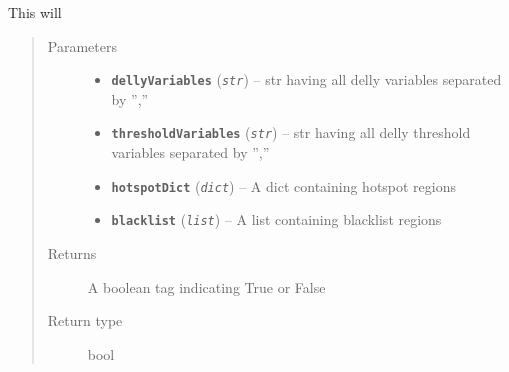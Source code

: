\documentclass[letterpaper,10pt,english]{sphinxmanual}
\begin{document}

\begin{fulllineitems}
\label{iCallSV:iCallSV.FilterDellyCalls.GetFilteredRecords}
This will 
\begin{quote}\begin{description}
\item[{Parameters}] \leavevmode\begin{itemize}
\item {} 
\textbf{\texttt{dellyVariables}} (\emph{\texttt{str}}) -- str having all delly variables separated by '',''

\item {} 
\textbf{\texttt{thresholdVariables}} (\emph{\texttt{str}}) -- str having all delly threshold variables separated by '',''

\item {} 
\textbf{\texttt{hotspotDict}} (\emph{\texttt{dict}}) -- A dict containing hotspot regions

\item {} 
\textbf{\texttt{blacklist}} (\emph{\texttt{list}}) -- A list containing blacklist regions

\end{itemize}

\item[{Returns}] \leavevmode
A boolean tag indicating True or False

\item[{Return type}] \leavevmode
bool

\end{description}\end{quote}

\end{fulllineitems}

\end{document}
